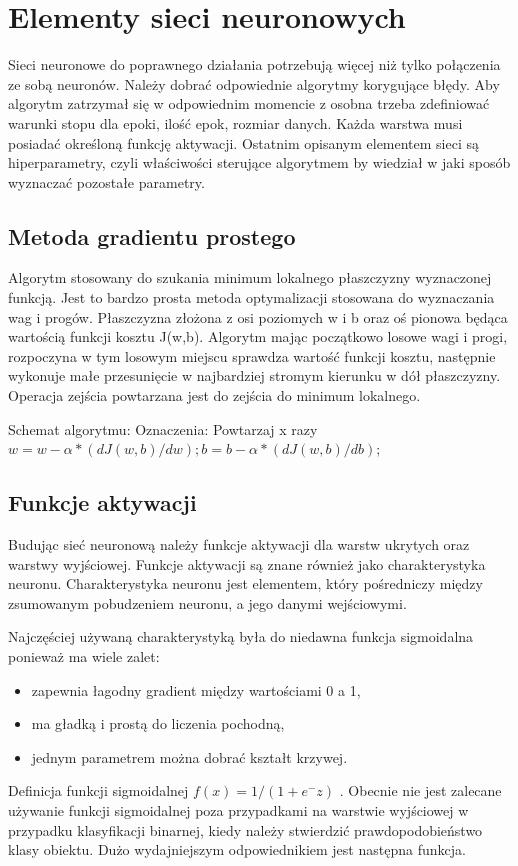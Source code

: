 \documentclass[12pt,a4paper,twoside,titlepage,openright]{book}
\begin{document}
\section{Elementy sieci neuronowych} 
Sieci neuronowe do poprawnego działania potrzebują więcej niż tylko połączenia ze sobą neuronów. Należy dobrać odpowiednie algorytmy korygujące błędy. Aby algorytm zatrzymał się w odpowiednim momencie z osobna trzeba zdefiniować warunki stopu dla epoki, ilość epok, rozmiar danych. Każda warstwa musi posiadać określoną funkcję aktywacji. Ostatnim opisanym elementem sieci są hiperparametry, czyli właściwości sterujące algorytmem by wiedział w jaki sposób wyznaczać pozostałe parametry.

\subsection{Metoda gradientu prostego}
Algorytm stosowany do szukania minimum lokalnego płaszczyzny wyznaczonej funkcją. Jest to bardzo prosta metoda optymalizacji stosowana do wyznaczania wag i progów. Płaszczyzna złożona z osi poziomych w i b oraz oś pionowa będąca wartością funkcji kosztu J(w,b). Algorytm mając początkowo losowe wagi i progi, rozpoczyna w tym losowym miejscu sprawdza wartość funkcji kosztu, następnie wykonuje małe przesunięcie w najbardziej stromym kierunku w dół płaszczyzny. Operacja zejścia powtarzana jest do zejścia do minimum lokalnego.

Schemat algorytmu:
Oznaczenia: 
Powtarzaj x razy {
	$w = w - \alpha * (dJ(w, b) / dw);
	 b = b - \alpha * (dJ(w, b) / db);$
}

\subsection{Funkcje aktywacji}
Budując sieć neuronową należy funkcje aktywacji dla warstw ukrytych oraz warstwy wyjściowej. Funkcje aktywacji są znane również jako charakterystyka neuronu. Charakterystyka neuronu jest elementem, który pośredniczy między zsumowanym pobudzeniem neuronu, a jego danymi wejściowymi. 

Najczęściej używaną charakterystyką była do niedawna funkcja sigmoidalna ponieważ ma wiele zalet:
\begin{itemize}
\item zapewnia łagodny gradient między wartościami 0 a 1,
\item ma gładką i prostą do liczenia pochodną,
\item jednym parametrem można dobrać kształt krzywej.
\end{itemize}
Definicja funkcji sigmoidalnej $ f(x) = 1 / (1+e^-z)$ .
Obecnie nie jest zalecane używanie funkcji sigmoidalnej poza przypadkami na warstwie wyjściowej w przypadku klasyfikacji binarnej, kiedy należy stwierdzić prawdopodobieństwo klasy obiektu. Dużo wydajniejszym odpowiednikiem jest następna funkcja.
\end{document}
